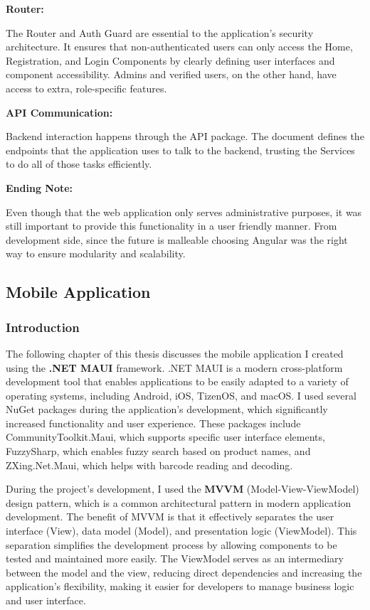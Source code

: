 \noindent\textbf{Router:} 

The Router and Auth Guard are essential to the application's security architecture. It ensures that non-authenticated users can only access the Home, Registration, and Login Components by clearly defining user interfaces and component accessibility. Admins and verified users, on the other hand, have access to extra, role-specific features.

\noindent\textbf{API Communication:}

Backend interaction happens through the API package. The document defines the endpoints that the application uses to talk to the backend, trusting the Services to do all of those tasks efficiently.

\noindent\textbf{Ending Note:}

Even though that the web application only serves administrative purposes, it was still important to provide this functionality in a user friendly manner. From development side, since the future is malleable choosing Angular was the right way to ensure modularity and scalability. 

\newpage

\subsection{Mobile Application}

\subsubsection{Introduction}

The following chapter of this thesis discusses the mobile application I created using the \textbf{.NET MAUI} framework. .NET MAUI is a modern cross-platform development tool that enables applications to be easily adapted to a variety of operating systems, including Android, iOS, TizenOS, and macOS. I used several NuGet packages during the application's development, which significantly increased functionality and user experience. These packages include CommunityToolkit.Maui, which supports specific user interface elements, FuzzySharp, which enables fuzzy search based on product names, and ZXing.Net.Maui, which helps with barcode reading and decoding.

During the project's development, I used the \textbf{MVVM} (Model-View-ViewModel) design pattern, which is a common architectural pattern in modern application development. The benefit of MVVM is that it effectively separates the user interface (View), data model (Model), and presentation logic (ViewModel). This separation simplifies the development process by allowing components to be tested and maintained more easily. The ViewModel serves as an intermediary between the model and the view, reducing direct dependencies and increasing the application's flexibility, making it easier for developers to manage business logic and user interface.

